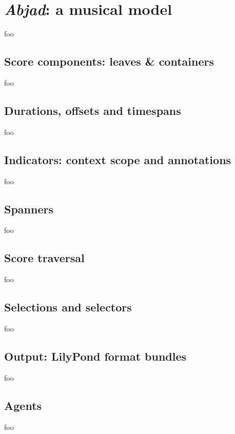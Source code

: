 \chapter{\emph{Abjad}: a musical model}

foo

\section{Score components: leaves \& containers}

foo

\section{Durations, offsets and timespans}

foo

\section{Indicators: context scope and annotations}

foo

\section{Spanners}

foo

\section{Score traversal}

foo

\section{Selections and selectors}

foo

\section{Output: LilyPond format bundles}

foo

\section{Agents}

foo